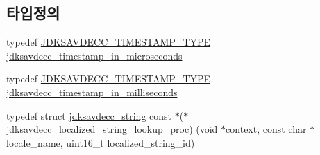 \subsection*{타입정의}
\begin{DoxyCompactItemize}
\item 
typedef \hyperlink{group__util_gadd24ee5a8dde672bc6f9bdf27b8f481e}{J\+D\+K\+S\+A\+V\+D\+E\+C\+C\+\_\+\+T\+I\+M\+E\+S\+T\+A\+M\+P\+\_\+\+T\+Y\+PE} \hyperlink{group__util_gaca5142930a1fb7fba0d88a9c2d16a848}{jdksavdecc\+\_\+timestamp\+\_\+in\+\_\+microseconds}
\item 
typedef \hyperlink{group__util_gadd24ee5a8dde672bc6f9bdf27b8f481e}{J\+D\+K\+S\+A\+V\+D\+E\+C\+C\+\_\+\+T\+I\+M\+E\+S\+T\+A\+M\+P\+\_\+\+T\+Y\+PE} \hyperlink{group__util_ga9b08eceba774185e34224dd593167363}{jdksavdecc\+\_\+timestamp\+\_\+in\+\_\+milliseconds}
\item 
typedef struct \hyperlink{structjdksavdecc__string}{jdksavdecc\+\_\+string} const $\ast$($\ast$ \hyperlink{group__util_ga5f9c1f7d10b0f5e8d7c250e8804e6d2e}{jdksavdecc\+\_\+localized\+\_\+string\+\_\+lookup\+\_\+proc}) (void $\ast$context, const char $\ast$locale\+\_\+name, uint16\+\_\+t localized\+\_\+string\+\_\+id)
\end{DoxyCompactItemize}
